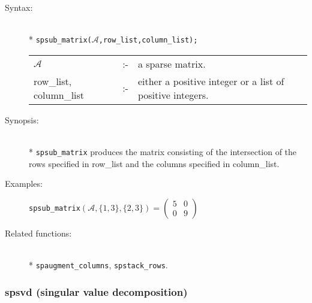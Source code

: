 \begin{description}
\item[Syntax:]\mbox{}\\*
\texttt{spsub\_matrix($\mathcal{A}$,row\_list,column\_list);}\\[2mm]
\begin{tabular}{l l l}
$\mathcal{A}$              &:-& a sparse matrix. \\
row\_list, column\_list &:-& \parbox[t]{.605\linewidth}{either a
positive integer or a list of positive integers.}
\end{tabular}

\item[Synopsis:]\mbox{}\\*
\texttt{spsub\_matrix} produces the matrix consisting of the
              intersection of the rows specified in row\_list and the
columns specified in column\_list.

\item[Examples:]
\begin{flushleft}
\hspace*{0.1in}
\texttt{spsub\_matrix}\((\mathcal{A},\{1,3\},\{2,3\}) =
        \begin{pmatrix} 5 & 0\\ 0 & 9 \end{pmatrix}
\)
\end{flushleft}

\item[Related functions:]\mbox{}\\*
\texttt{spaugment\_columns}, \texttt{spstack\_rows}.
\end{description}

\subsubsection{spsvd (singular value decomposition)}
\label{sparse:spsvd}

